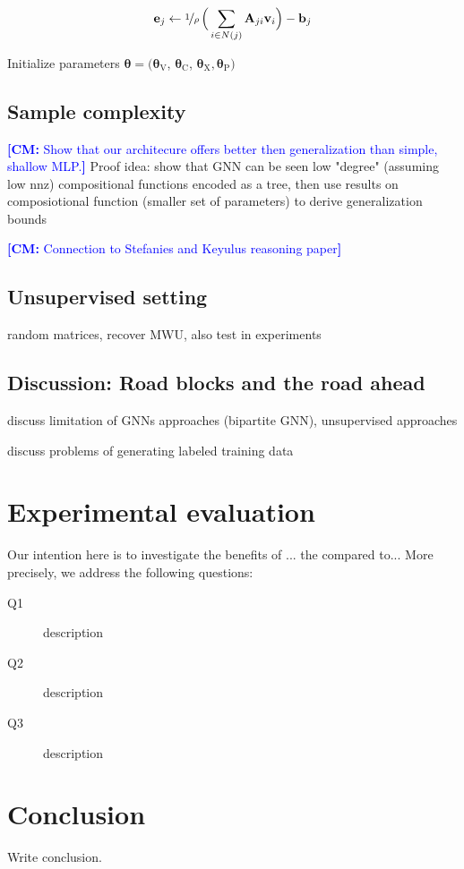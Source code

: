 \documentclass[11pt, DIV=12]{scrartcl}
\theoremstyle{definition}
\renewcommand{\vec}[1]{\mathbf{#1}}
\newcommand{\cm}[1]{{{\textcolor{blue}{\textbf{[CM:} {#1}\textbf{]}}}}}
\begin{document}
\begin{equation}\label{err}
\vec{e}_j \leftarrow \nicefrac{1}{\rho}\,\Big(\sum_{i \in N(j)} \vec{A}_{ji}  \vec{v}_i \Big) - \vec{b}_j   
\end{equation}



Initialize parameters $\boldsymbol{\theta} = (\boldsymbol{\theta}_{\text{V}}$, $\boldsymbol{\theta}_{\text{C}}$, $\boldsymbol{\theta}_{\text{X}}, \boldsymbol{\theta}_{\text{P}})$



\subsection{Sample complexity}

\cm{Show that our architecure offers better then generalization than simple, shallow MLP.}
Proof idea: show that GNN can be seen low "degree" (assuming low nnz) compositional functions encoded as a tree, then use results on composiotional function (smaller set of parameters) to derive generalization bounds



\cm{Connection to Stefanies and Keyulus reasoning paper}

\subsection{Unsupervised setting}

random matrices, recover MWU, also test in experiments


\subsection{Discussion: Road blocks and the road ahead}
						
discuss limitation of GNNs approaches (bipartite GNN), unsupervised approaches

discuss problems of generating labeled training data

\section{Experimental evaluation}

Our intention here is to investigate the benefits of ... the compared to...
More precisely, we address the following questions:\\
\begin{description}
	\item[Q1] description
	\item[Q2] description
	\item[Q3] description
\end{description}

\section{Conclusion}
Write conclusion.			

 

	
\end{document}
